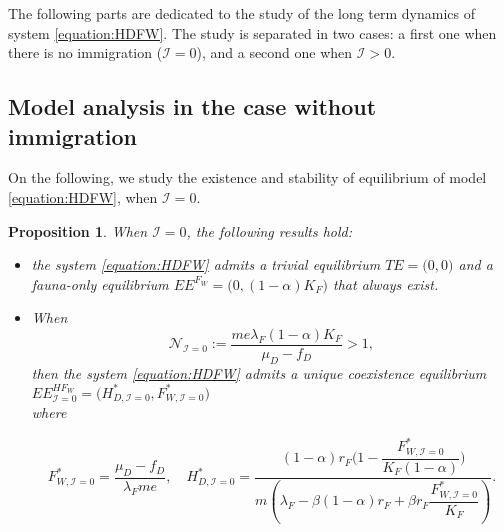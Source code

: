 \documentclass{article}
\newcommand{\lfw}{\lambda_{F}}
\newcommand{\lfw}{\lambda_{F}}
\newcommand{\cI}{\mathcal{I}}
\newtheorem{prop}{Proposition}
\begin{document}
%

The following parts are dedicated to the study of the long term dynamics of system \eqref{equation:HDFW}. The study is separated in two cases: a first one when there is no immigration ($\cI = 0$), and a second one when $\cI > 0$.

\subsection{Model analysis in the case without immigration}

On the following, we study the existence and stability of equilibrium of model \eqref{equation:HDFW}, when $\cI = 0$.

\begin{prop}
\label{prop:equilibre, cI=0}
When $\cI = 0$, the following results hold:
\begin{itemize}
\item the system \eqref{equation:HDFW} admits a trivial equilibrium $TE = \Big(0,0\Big)$ and a fauna-only equilibrium $EE^{F_W} = \Big(0, (1-\alpha)K_F \Big)$ that always exist.

\item When
$$
\mathcal{N}_{\cI = 0} := \dfrac{m e \lfw (1-\alpha)K_F}{\mu_D - f_D} >1,
$$ 
then the system \eqref{equation:HDFW} admits a unique coexistence equilibrium $EE^{HF_W}_{\cI = 0} = \Big(H^*_{D, \cI = 0}, F^*_{W, \cI = 0}\Big)$ \\ 
where 


$$F^*_{W, \cI = 0} = \dfrac{\mu_D - f_D}{\lfw m e},
\quad 
H^*_{D, \cI = 0} = \dfrac{(1-\alpha)r_F\Big(1 - \dfrac{F^*_{W, \cI = 0}}{K_F(1-\alpha)} \Big)}{m\left(\lfw - \beta (1-\alpha) r_F + \beta r_F  \dfrac{F^*_{W, \cI = 0}}{K_F}\right)}.
$$
\end{itemize}
\end{prop}
\end{document}
